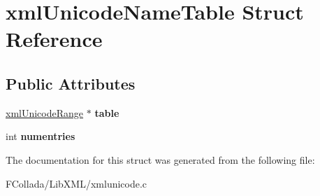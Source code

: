 \hypertarget{structxmlUnicodeNameTable}{
\section{xmlUnicodeNameTable Struct Reference}
\label{structxmlUnicodeNameTable}
}
\subsection*{Public Attributes}
\begin{DoxyCompactItemize}
\item 
\hypertarget{structxmlUnicodeNameTable_a11c442bc2b5e154965125eeccb959337}{
\hyperlink{structxmlUnicodeRange}{xmlUnicodeRange} $\ast$ {\bfseries table}}
\label{structxmlUnicodeNameTable_a11c442bc2b5e154965125eeccb959337}

\item 
\hypertarget{structxmlUnicodeNameTable_adbff18f7120501aed5cdc532287ee68a}{
int {\bfseries numentries}}
\label{structxmlUnicodeNameTable_adbff18f7120501aed5cdc532287ee68a}

\end{DoxyCompactItemize}


The documentation for this struct was generated from the following file:\begin{DoxyCompactItemize}
\item 
FCollada/LibXML/xmlunicode.c\end{DoxyCompactItemize}
